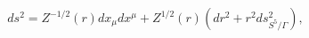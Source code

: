 \begin{equation}
ds^2=Z^{-1/2}(r)dx_{\mu} dx^{\mu}+Z^{1/2}(r)(dr^2+r^2 ds^2_{S^5/\Gamma}),
\label{st2}
\end{equation}

